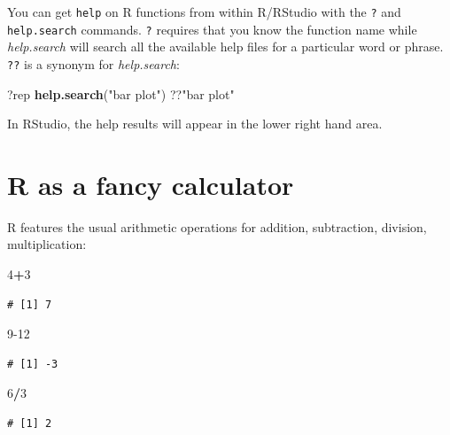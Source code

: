 \documentclass[
  a4paperpaper,
]{book}
\newenvironment{Shaded}{\begin{snugshade}}{\end{snugshade}}
\newcommand{\DecValTok}[1]{\textcolor[rgb]{0.00,0.00,0.81}{#1}}
\newcommand{\KeywordTok}[1]{\textcolor[rgb]{0.13,0.29,0.53}{\textbf{#1}}}
\newcommand{\NormalTok}[1]{#1}
\newcommand{\OperatorTok}[1]{\textcolor[rgb]{0.81,0.36,0.00}{\textbf{#1}}}
\newcommand{\StringTok}[1]{\textcolor[rgb]{0.31,0.60,0.02}{#1}}
\begin{document}
You can get \texttt{help} on R functions from within R/RStudio with the \texttt{?} and \texttt{help.search} commands. \texttt{?} requires that you know the function name while \emph{help.search} will search all the available help files for a particular word or phrase. \texttt{??} is a synonym for \emph{help.search}:

\begin{Shaded}
\begin{Highlighting}[]
\NormalTok{?rep}
\KeywordTok{help.search}\NormalTok{(}\StringTok{"bar plot"}\NormalTok{)}
\NormalTok{??}\StringTok{"bar plot"}
\end{Highlighting}
\end{Shaded}

In RStudio, the help results will appear in the lower right hand area.

\hypertarget{r-as-a-fancy-calculator}{%
\section{R as a fancy calculator}\label{r-as-a-fancy-calculator}}

R features the usual arithmetic operations for addition, subtraction, division, multiplication:

\begin{Shaded}
\begin{Highlighting}[]
\DecValTok{4}\OperatorTok{+}\DecValTok{3} 
\end{Highlighting}
\end{Shaded}

\begin{verbatim}
# [1] 7
\end{verbatim}

\begin{Shaded}
\begin{Highlighting}[]
\DecValTok{9{-}12}
\end{Highlighting}
\end{Shaded}

\begin{verbatim}
# [1] -3
\end{verbatim}

\begin{Shaded}
\begin{Highlighting}[]
\DecValTok{6}\OperatorTok{/}\DecValTok{3}
\end{Highlighting}
\end{Shaded}

\begin{verbatim}
# [1] 2
\end{verbatim}
\end{document}
